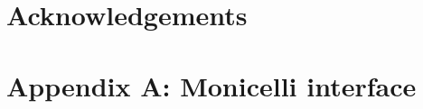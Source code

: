 \documentclass[preprint,3p,10pt]{elsarticle}
\begin{document}

\section*{Acknowledgements}

\section{Appendix A: Monicelli interface}




\end{document}
